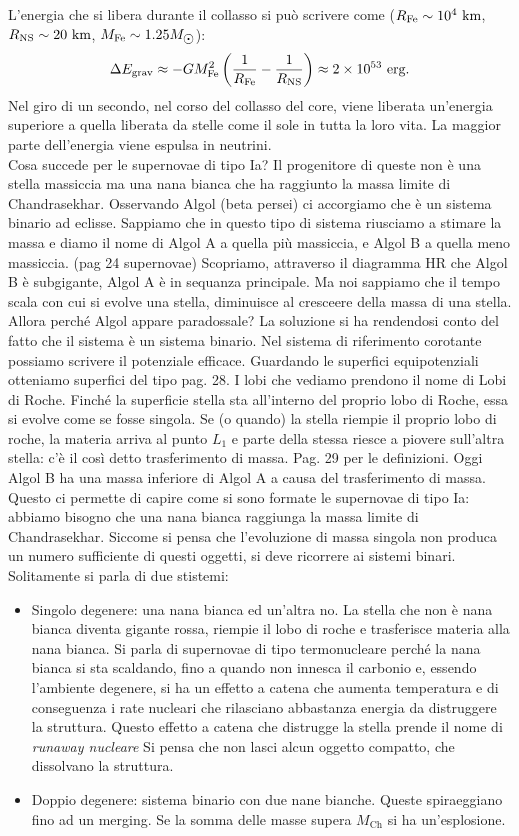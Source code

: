 L'energia che si libera durante il collasso si può scrivere come ($R_{\ce{Fe}}\sim 10^4\um{km}$, $R_{\text{NS}}\sim 20\text{ km}$, $M_{\ce{Fe}}\sim1.25\sunmass$):
\begin{equation*}
    \Delta E_{\text{grav}}\approx -GM_{\ce{Fe}}^2\left( \frac{1}{R_{\ce{Fe}}}-\frac{1}{R_{\text{NS}}}\right)\approx 2\times 10^{53}\um{erg}.
\end{equation*}
Nel giro di un secondo, nel corso del collasso del core, viene liberata un'energia superiore a quella liberata da stelle come il sole in tutta la loro vita. La maggior parte dell'energia viene espulsa in neutrini.\\
Cosa succede per le supernovae di tipo Ia? Il progenitore di queste non è una stella massiccia ma una nana bianca che ha raggiunto la massa limite di Chandrasekhar. Osservando Algol (beta persei) ci accorgiamo che è un sistema binario ad eclisse. Sappiamo che in questo tipo di sistema riusciamo a stimare la massa e diamo il nome di Algol A a quella più massiccia, e Algol B a quella meno massiccia. (pag 24 supernovae) Scopriamo, attraverso il diagramma HR che Algol B è subgigante, Algol A è in sequanza principale. Ma noi sappiamo che il tempo scala con cui si evolve una stella, diminuisce al cresceere della massa di una stella. Allora perché Algol appare paradossale? La soluzione si ha rendendosi conto del fatto che il sistema è un sistema binario. Nel sistema di riferimento corotante possiamo scrivere il potenziale efficace. Guardando le superfici equipotenziali otteniamo superfici del tipo pag. 28. I lobi che vediamo prendono il nome di Lobi di Roche. Finché la superficie stella sta all'interno del proprio lobo di Roche, essa si evolve come se fosse singola. Se (o quando) la stella riempie il proprio lobo di roche, la materia arriva al punto $L_1$ e parte della stessa riesce a piovere sull'altra stella: c'è il così detto trasferimento di massa. Pag. 29 per le definizioni. Oggi Algol B ha una massa inferiore di Algol A a causa del trasferimento di massa. Questo ci permette di capire come si sono formate le supernovae di tipo Ia: abbiamo bisogno che una nana bianca raggiunga la massa limite di Chandrasekhar. Siccome si pensa che l'evoluzione di massa singola non produca un numero sufficiente di questi oggetti, si deve ricorrere ai sistemi binari. Solitamente si parla di due stistemi:
\begin{itemize}
    \item Singolo degenere: una nana bianca ed un'altra no. La stella che non è nana bianca diventa gigante rossa, riempie il lobo di roche e trasferisce materia alla nana bianca. Si parla di supernovae di tipo termonucleare perché la nana bianca si sta scaldando, fino a quando non innesca il carbonio e, essendo l'ambiente degenere, si ha un effetto a catena che aumenta temperatura e di conseguenza i rate nucleari che rilasciano abbastanza energia da distruggere la struttura. Questo effetto a catena che distrugge la stella prende il nome di \textit{runaway nucleare} Si pensa che non lasci alcun oggetto compatto, che dissolvano la struttura.
    \item Doppio degenere: sistema binario con due nane bianche. Queste spiraeggiano fino ad un merging. Se la somma delle masse supera $M_{\text{Ch}}$ si ha un'esplosione.
\end{itemize}
